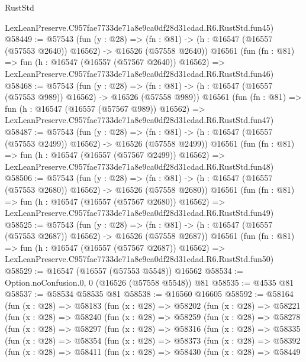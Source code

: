 \begin{lexlean}{RustStd}
\begin{coremodule}
    LexLeanPreserve.C957fae7733de71a8e9ca0df28d31cdad.R6.RustStd.fun45)
@58449 := @57543
    (fun (y : @28) =>
    (fn : @81) -> (h : @16547 (@16557 (@57553 @2640)) @16562) -> @16526 (@57558 @2640))
    @16561
    (fun (fn : @81) =>
    fun (h : @16547 (@16557 (@57567 @2640)) @16562) =>
    LexLeanPreserve.C957fae7733de71a8e9ca0df28d31cdad.R6.RustStd.fun46)
@58468 := @57543
    (fun (y : @28) =>
    (fn : @81) -> (h : @16547 (@16557 (@57553 @989)) @16562) -> @16526 (@57558 @989))
    @16561
    (fun (fn : @81) =>
    fun (h : @16547 (@16557 (@57567 @989)) @16562) =>
    LexLeanPreserve.C957fae7733de71a8e9ca0df28d31cdad.R6.RustStd.fun47)
@58487 := @57543
    (fun (y : @28) =>
    (fn : @81) -> (h : @16547 (@16557 (@57553 @2499)) @16562) -> @16526 (@57558 @2499))
    @16561
    (fun (fn : @81) =>
    fun (h : @16547 (@16557 (@57567 @2499)) @16562) =>
    LexLeanPreserve.C957fae7733de71a8e9ca0df28d31cdad.R6.RustStd.fun48)
@58506 := @57543
    (fun (y : @28) =>
    (fn : @81) -> (h : @16547 (@16557 (@57553 @2680)) @16562) -> @16526 (@57558 @2680))
    @16561
    (fun (fn : @81) =>
    fun (h : @16547 (@16557 (@57567 @2680)) @16562) =>
    LexLeanPreserve.C957fae7733de71a8e9ca0df28d31cdad.R6.RustStd.fun49)
@58525 := @57543
    (fun (y : @28) =>
    (fn : @81) -> (h : @16547 (@16557 (@57553 @2687)) @16562) -> @16526 (@57558 @2687))
    @16561
    (fun (fn : @81) =>
    fun (h : @16547 (@16557 (@57567 @2687)) @16562) =>
    LexLeanPreserve.C957fae7733de71a8e9ca0df28d31cdad.R6.RustStd.fun50)
@58529 := @16547 (@16557 (@57553 @5548)) @16562
@58534 := Option.noConfusion.{0, 0} (@16526 (@57558 @5548)) @81
@58535 := @4535 @81
@58537 := @58534 @58535 @81
@58538 := @16560 @16605
@58592 := @58164
    (fun (x : @28) =>
    @58183
      (fun (x : @28) =>
      @58202
        (fun (x : @28) =>
        @58221
          (fun (x : @28) =>
          @58240
            (fun (x : @28) =>
            @58259
              (fun (x : @28) =>
              @58278
                (fun (x : @28) =>
                @58297
                  (fun (x : @28) =>
                  @58316
                    (fun (x : @28) =>
                    @58335
                      (fun (x : @28) =>
                      @58354
                        (fun (x : @28) =>
                        @58373
                          (fun (x : @28) =>
                          @58392
                            (fun (x : @28) =>
                            @58411
                              (fun (x : @28) =>
                              @58430
                                (fun (x : @28) =>
                                @58449

\end{coremodule}
\end{lexlean}

